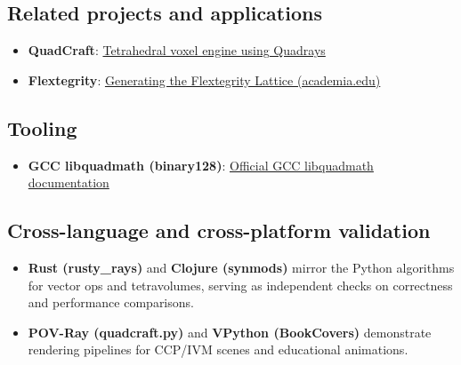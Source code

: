 \documentclass[
]{article}
\providecommand{\tightlist}{%
  \setlength{\itemsep}{0pt}\setlength{\parskip}{0pt}}
\begin{document}
\hypertarget{related-projects-and-applications}{%
\subsection{Related projects and
applications}\label{related-projects-and-applications}}

\begin{itemize}
\tightlist
\item
  \textbf{QuadCraft}:
  \href{https://github.com/docxology/quadcraft/}{Tetrahedral voxel
  engine using Quadrays}
\item
  \textbf{Flextegrity}:
  \href{https://www.academia.edu/44531954/Generating_the_Flextegrity_Lattice}{Generating
  the Flextegrity Lattice (academia.edu)}
\end{itemize}

\hypertarget{tooling}{%
\subsection{Tooling}\label{tooling}}

\begin{itemize}
\tightlist
\item
  \textbf{GCC libquadmath (binary128)}:
  \href{https://gcc.gnu.org/onlinedocs/libquadmath/index.html}{Official
  GCC libquadmath documentation}
\end{itemize}

\hypertarget{cross-language-and-cross-platform-validation}{%
\subsection{Cross-language and cross-platform
validation}\label{cross-language-and-cross-platform-validation}}

\begin{itemize}
\tightlist
\item
  \textbf{Rust (rusty\_rays)} and \textbf{Clojure (synmods)} mirror the
  Python algorithms for vector ops and tetravolumes, serving as
  independent checks on correctness and performance comparisons.
\item
  \textbf{POV-Ray (quadcraft.py)} and \textbf{VPython (BookCovers)}
  demonstrate rendering pipelines for CCP/IVM scenes and educational
  animations.
\end{itemize}
\end{document}
